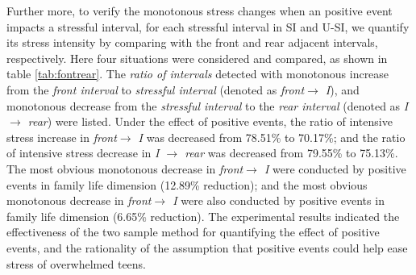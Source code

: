 Further more,
to verify the monotonous stress changes when an positive event impacts a stressful interval,
for each stressful interval in SI and U-SI,
we quantify its stress intensity by comparing with the front and rear adjacent intervals, respectively.
Here four situations were considered and compared,
as shown in table \ref{tab:fontrear}.
The \emph{ratio of intervals} detected with monotonous increase from the \emph{front interval} to \emph{stressful interval} (denoted as \emph{front$ \rightarrow$ I}),
and monotonous decrease from the \emph{stressful interval} to the \emph{rear interval} (denoted as \emph{I $\rightarrow$ rear}) were listed.
Under the effect of positive events,
the ratio of intensive stress increase in \emph{front$ \rightarrow$ I} was decreased from 78.51\% to 70.17\%;
and the ratio of intensive stress decrease in \emph{I $\rightarrow$ rear} was decreased from 79.55\% to 75.13\%.
The most obvious monotonous decrease in \emph{front$ \rightarrow$ I} were conducted by positive events in family life dimension (12.89\% reduction);
and the most obvious monotonous decrease in \emph{front$ \rightarrow$ I} were also conducted by positive events in family life dimension (6.65\% reduction).
The experimental results indicated the effectiveness of the two sample method for quantifying the effect of positive events,
and the rationality of the assumption that positive events could help ease stress of overwhelmed teens.


